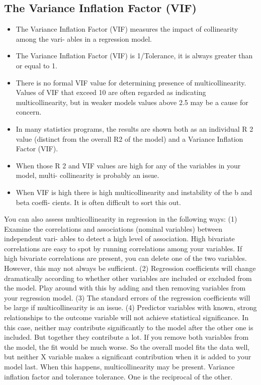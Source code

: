 \documentclass[a4paper,12pt]{article}
\begin{document}
\subsection*{ The Variance Inflation Factor (VIF)}
\begin{itemize}
\item The Variance Inflation Factor (VIF) measures the impact of collinearity among the vari-
ables in a regression model.
\item The Variance Inflation Factor (VIF) is 1/Tolerance, it is always greater than or equal to
1.
\item There is no formal VIF value for determining presence of multicollinearity. Values of VIF
that exceed 10 are often regarded as indicating multicollinearity, but in weaker models
values above 2.5 may be a cause for concern.
\item In many statistics programs, the results are shown both as an individual R 2 value (distinct
from the overall R2 of the model) and a Variance Inflation Factor (VIF).
\item When those R 2 and VIF values are high for any of the variables in your model, multi-
collinearity is probably an issue.
\item When VIF is high there is high multicollinearity and instability of the b and beta coeffi-
cients. It is often difficult to sort this out.
\end{itemize}
You can also assess multicollinearity in regression in the following ways:
(1) Examine the correlations and associations (nominal variables) between independent vari-
ables to detect a high level of association. High bivariate correlations are easy to spot by
running correlations among your variables. If high bivariate correlations are present, you
can delete one of the two variables. However, this may not always be sufficient.
(2) Regression coefficients will change dramatically according to whether other variables are
included or excluded from the model. Play around with this by adding and then removing
variables from your regression model.
(3) The standard errors of the regression coefficients will be large if multicollinearity is an
issue.
(4) Predictor variables with known, strong relationships to the outcome variable will not
achieve statistical significance. In this case, neither may contribute significantly to the
model after the other one is included. But together they contribute a lot. If you remove
both variables from the model, the fit would be much worse. So the overall model fits
the data well, but neither X variable makes a significant contribution when it is added to
your model last. When this happens, multicollinearity may be present.
Variance inflation factor and tolerance tolerance. One is the reciprocal of the other.
\end{document}
